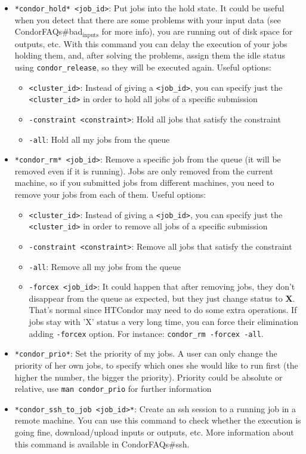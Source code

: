 \documentclass[a4paper,10pt]{article}
\begin{document}
\begin{itemize}
\item \texttt{*condor\_hold* <job\_id>}: Put jobs into the hold state. It could be useful
when you detect that there are some problems with your input data (see
CondorFAQs\#bad\(_{\text{inputs}}\) for more info), you are running out of disk space for
outputs, etc. With this command you can delay the execution of your jobs
holding them, and, after solving the problems, assign them the idle status
using \texttt{condor\_release}, so they will be executed again. Useful options:
\begin{itemize}
\item \texttt{<cluster\_id>}: Instead of giving a \texttt{<job\_id>}, you can specify just the
\texttt{<cluster\_id>} in order to hold all jobs of a specific submission
\item \texttt{-constraint <constraint>}: Hold all jobs that satisfy the constraint
\item \texttt{-all}: Hold all my jobs from the queue
\end{itemize}

\item \texttt{*condor\_rm* <job\_id>}: Remove a specific job from the queue (it will be
removed even if it is running). Jobs are only removed from the current
machine, so if you submitted jobs from different machines, you need to remove
your jobs from each of them. Useful options:
\begin{itemize}
\item \texttt{<cluster\_id>}: Instead of giving a \texttt{<job\_id>}, you can specify just the
\texttt{<cluster\_id>} in order to remove all jobs of a specific submission
\item \texttt{-constraint <constraint>}: Remove all jobs that satisfy the constraint
\item \texttt{-all}: Remove all my jobs from the queue
\item \texttt{-forcex <job\_id>}: It could happen that after removing jobs, they don't
disappear from the queue as expected, but they just change status to
\textbf{X}. That's normal since HTCondor may need to do some extra operations. If
jobs stay with 'X' status a very long time, you can force their elimination
adding \texttt{-forcex} option. For instance: \texttt{condor\_rm -forcex -all}.
\end{itemize}

\item \texttt{*condor\_prio*}: Set the priority of my jobs. A user can only change the
priority of her own jobs, to specify which ones she would like to run first
(the higher the number, the bigger the priority). Priority could be absolute
or relative, use \texttt{man condor\_prio} for further information

\item \texttt{*condor\_ssh\_to\_job <job\_id>*}: Create an ssh session to a running job in a
remote machine. You can use this command to check whether the execution is
going fine, download/upload inputs or outputs, etc. More information about
this command is available in CondorFAQs\#ssh.
\end{itemize}
\end{document}
